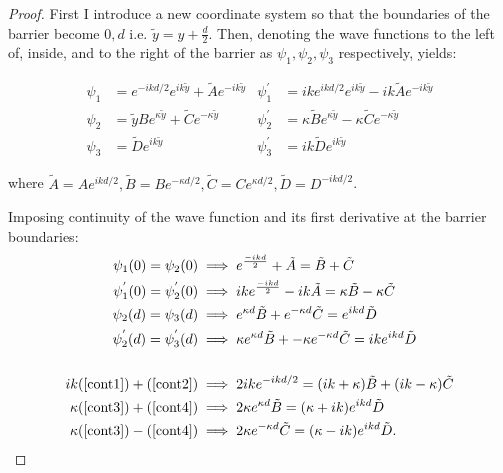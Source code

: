 \documentclass{article}
\begin{document}
\begin{proof}
	\noindent First I introduce a new coordinate system so that the boundaries of the barrier become $0,d \text{ i.e. } \tilde{y} = y+\frac{d}{2}$. Then, denoting the wave functions to the left of, inside, and to the right of the barrier as $\psi_{1}, \psi_{2}, \psi_{3}$ respectively, yields:

\begin{subequations}
\begin{align}
	\psi_{1} &= e^{-ikd/2}e^{ik\tilde{y}} + \tilde{A}e^{-ik\tilde{y}} & \psi_{1}^{'} &= ike^{ikd/2}e^{ik\tilde{y}} - ik\tilde{A}e^{-ik\tilde{y}} \\
	\psi_{2} &= \tilde{y}Be^{\kappa\tilde{y}} + \tilde{C}e^{-\kappa\tilde{y}} & \psi_{2}^{'} &= \kappa\tilde{B}e^{\kappa\tilde{y}} -\kappa \tilde{C}e^{-\kappa \tilde{y}} \\
	\psi_{3} &= \tilde{D}e^{ik\tilde{y}} & \psi_{3}^{'} &= ik\tilde{D}e^{ik\tilde{y}}
\end{align}
\end{subequations}

\noindent where $\tilde{A} = Ae^{ikd/2}, \tilde{B} = Be^{-\kappa d/2}, \tilde{C} = Ce^{\kappa d/2}, \tilde{D} = D^{-ikd/2}$.

\noindent Imposing continuity of the wave function and its first derivative at the barrier boundaries:
\begin{subequations}
\begin{align}
	\psi_{1}(0) = \psi_{2}(0) &\implies e^{\frac{-ikd}{2}}+\tilde{A} = \tilde{B}+\tilde{C} \label{cont1}\\
	\psi_{1}^{'}(0) = \psi_{2}^{'}(0) &\implies ike^{\frac{-ikd}{2}} - ik\tilde{A} = \kappa \tilde{B} - \kappa \tilde{C} \label{cont2}\\
	\psi_{2}(d) = \psi_{3}(d) &\implies e^{\kappa d}\tilde{B} + e^{-\kappa d}\tilde{C} = e^{ikd}\tilde{D} \label{cont3}\\
	\psi_{2}^{'}(d) = \psi_{3}^{'}(d) &\implies \kappa e^{\kappa d}\tilde{B} + -\kappa e^{-\kappa d}\tilde{C} = ike^{ikd}\tilde{D} \label{cont4}\\
	\\
	ik(\ref{cont1})+(\ref{cont2}) &\implies 2ike^{-ikd/2} = (ik+\kappa)\tilde{B}+(ik-\kappa)\tilde{C} \label{cont5}\\
	\kappa(\ref{cont3})+(\ref{cont4}) &\implies 2\kappa e^{\kappa d}\tilde{B} = (\kappa+ik)e^{ikd}\tilde{D} \label{cont7}\\
	\kappa(\ref{cont3})-(\ref{cont4}) &\implies 2\kappa e^{-\kappa d}\tilde{C} = (\kappa-ik)e^{ikd}\tilde{D} \label{cont8}.
	\end{align}
\end{subequations}


\end{proof}
\end{document}
